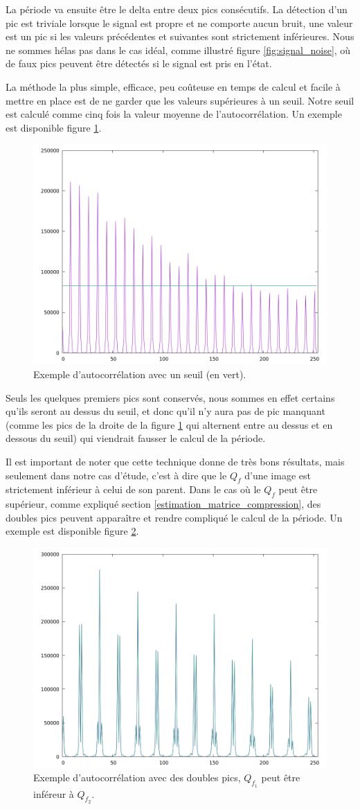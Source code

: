 \documentclass[utf8,final]{stageM2R} %
\begin{document}
La période va ensuite être le delta entre deux pics consécutifs. La détection d'un pic est triviale lorsque le signal est propre et ne comporte aucun bruit, une valeur est un pic si les valeurs précédentes et suivantes sont strictement inférieures. Nous ne sommes hélas pas dans le cas idéal, comme illustré figure \ref{fig:signal_noise}, où de faux pics peuvent être détectés si le signal est pris en l'état.

La méthode la plus simple, efficace,  peu coûteuse en temps de calcul et facile à mettre en place est de ne garder que les valeurs supérieures à un seuil. Notre seuil est calculé comme cinq fois la valeur moyenne de l'autocorrélation. Un exemple est disponible figure \ref{fig:signal_filtered}.

\begin{figure}[H]
    \centering
    \includegraphics[width=0.5\linewidth]{images/autocorrelation_filtered}
    \caption{Exemple d'autocorrélation avec un seuil (en vert).}
    \label{fig:signal_filtered}
\end{figure}

Seuls les quelques premiers pics sont conservés, nous sommes en effet certains qu'ils seront au dessus du seuil, et donc qu'il n'y aura pas de pic manquant (comme les pics de la droite de la figure \ref{fig:signal_filtered} qui alternent entre au dessus et en dessous du seuil) qui viendrait fausser le calcul de la période.

Il est important de noter que cette technique donne de très bons résultats, mais seulement dans notre cas d'étude, c'est à dire que le $Q_f$ d'une image est strictement inférieur à celui de son parent. Dans le cas où le $Q_f$ peut être supérieur, comme expliqué section \ref{estimation_matrice_compression}, des doubles pics peuvent apparaître et rendre compliqué le calcul de la période. Un exemple est disponible figure \ref{fig:double_peaks}.

\begin{figure}[H]
    \centering
    \includegraphics[width=0.5\linewidth]{images/autocorrelation_double}
    \caption{Exemple d'autocorrélation avec des doubles pics, $Q_{f_1}$ peut être inféreur à $Q_{f_2}$.}
    \label{fig:double_peaks}
\end{figure}
\end{document}
